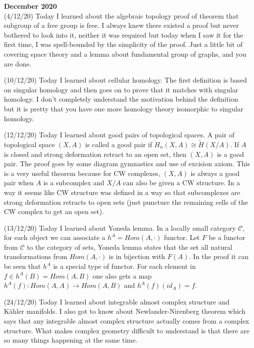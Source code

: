\documentclass[12pt,a4paper]{article}
\begin{document}
\maketitle\textbf{December 2020}
\\


(4/12/20) Today I learned about the algebraic topology proof of theorem that subgroup of a free group is free. I always knew there existed a proof but never bothered to look into it, neither it was required but today when I saw it for the first time, I was spell-bounded by the simplicity of the proof. Just a little bit of covering space theory and a lemma about fundamental group of graphs, and you are done.

(10/12/20) Today I learned about cellular homology. The first definition is based on singular homology and then goes on to prove that it matches with singular homology. I don't completely understand the motivation behind the definition but it is pretty that you have one more homology theory isomorphic to singular homology.

(12/12/20) Today I learned about good pairs of topological spaces. A pair of topological space $(X,A)$ is called a good pair if $H_n(X,A) \cong \tilde{H}(X/A)$. If $A$ is closed and strong deformation retract to an open set, then $(X,A)$ is a good pair. The proof goes by some diagram gymnastics and use of excision axiom. This is a very useful theorem because for CW complexes, $(X,A)$ is always a good pair when $A$ is a subcomplex and $X/A$ can also be given a CW structure. In a way it seems like CW structure was defined in a way so that subcomplexes are strong deformation retracts to open sets (just puncture the remaining cells of the CW complex to get an open set).

(13/12/20) Today I learned about Yoneda lemma. In a locally small category $\mathcal{C}$, for each object we can associate a $h^A = Hom (A, \cdot)$ functor. Let $F$ be a functor from $\mathcal{C}$ to the category of sets, Yoneda lemma states that the set all natural transformations from $Hom(A, \cdot )$ is in bijection with $F(A)$. In the proof it can be seen that $h^A$ is a special type of functor. For each element in $f \in h^A(B) = Hom(A,B)$ one also gets a map $h^A(f) : Hom(A,A) \to Hom (A,B)$ and $h^A(f)(id_A) = f$.
    
(24/12/20) Today I learned about integrable almost complex structure and K\"{a}hler manifolds. I also got to know about Newlander-Nirenberg theorem which says that any integrable almost complex structure actually comes from a complex structure. What makes complex geometry difficult to understand is that there are so many things happening at the same time.
\end{document}
